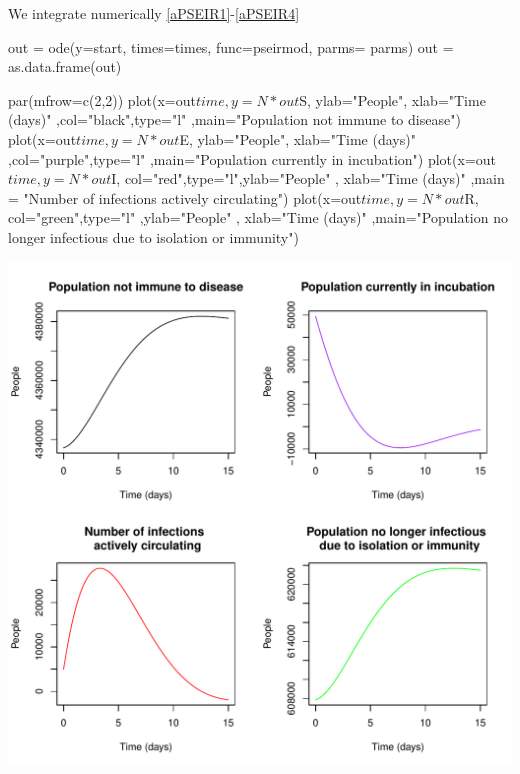 \documentclass[12pt]{article}\usepackage[]{graphicx}\usepackage[]{color}
\makeatletter
\def\maxwidth{ %
  \ifdim\Gin@nat@width>\linewidth
    \linewidth
  \else
    \Gin@nat@width
  \fi
}
\makeatother
\begin{document}
We integrate numerically \eqref{aPSEIR1}-\eqref{aPSEIR4}

\begin{Schunk}
\begin{Sinput}
out = ode(y=start, times=times, func=pseirmod, parms= parms)
out = as.data.frame(out) 
\end{Sinput}
\end{Schunk}

\begin{Schunk}
\begin{Sinput}
par(mfrow=c(2,2))
plot(x=out$time, y=N*out$S, ylab="People", xlab="Time (days)"
	,col="black",type="l"
  ,main="Population not immune to disease") 
plot(x=out$time, y=N*out$E, ylab="People", xlab="Time (days)"
	,col="purple",type="l"
  ,main="Population currently in incubation") 
plot(x=out$time, y=N*out$I, col="red",type="l",ylab="People"
	, xlab="Time (days)"
  ,main = "Number of infections \n actively circulating") 
plot(x=out$time, y=N*out$R, col="green",type="l"
	,ylab="People"
  , xlab="Time (days)"
  ,main="Population no longer infectious \n due to isolation or immunity") 
\end{Sinput}

\includegraphics[width=\maxwidth]{figure/unnamed-chunk-13-1} \end{Schunk}
\end{document}
